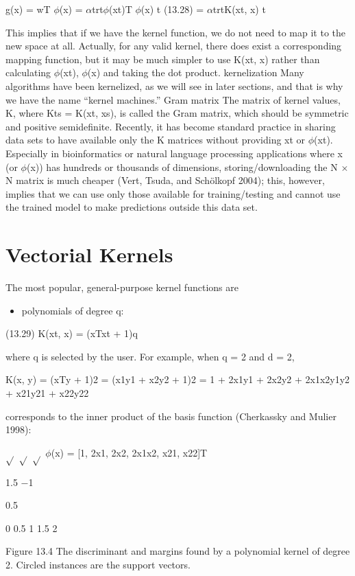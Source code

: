 g(x) = wT $\phi$(x) = $\alpha$trt$\phi$(xt)T $\phi$(x) t (13.28) = $\alpha$trtK(xt, x) t

This implies that if we have the kernel function, we do not need to map it to the new space at all. Actually, for any valid kernel, there does exist a corresponding mapping function, but it may be much simpler to use K(xt, x) rather than calculating $\phi$(xt), $\phi$(x) and taking the dot product. kernelization Many algorithms have been kernelized, as we will see in later sections, and that is why we have the name “kernel machines.” Gram matrix The matrix of kernel values, K, where Kts = K(xt, xs), is called the Gram matrix, which should be symmetric and positive semidefinite. Recently, it has become standard practice in sharing data sets to have available only the K matrices without providing xt or $\phi$(xt). Especially in bioinformatics or natural language processing applications where x (or $\phi$(x)) has hundreds or thousands of dimensions, storing/downloading the N $\times$ N matrix is much cheaper (Vert, Tsuda, and Schölkopf 2004); this, however, implies that we can use only those available for training/testing and cannot use the trained model to make predictions outside this data set.

\section{Vectorial Kernels}

The most popular, general-purpose kernel functions are

\begin{itemize}
\item polynomials of degree q:
\end{itemize}

(13.29) K(xt, x) = (xTxt + 1)q

where q is selected by the user. For example, when q = 2 and d = 2,

K(x, y) = (xTy + 1)2 = (x1y1 + x2y2 + 1)2 = 1 + 2x1y1 + 2x2y2 + 2x1x2y1y2 + x21y21 + x22y22

corresponds to the inner product of the basis function (Cherkassky and Mulier 1998):

$\sqrt{}$ $\sqrt{}$ $\sqrt{}$ $\phi$(x) = [1, 2x1, 2x2, 2x1x2, x21, x22]T

1.5 $-$1

0.5

0 0.5 1 1.5 2

Figure 13.4 The discriminant and margins found by a polynomial kernel of degree 2. Circled instances are the support vectors.

